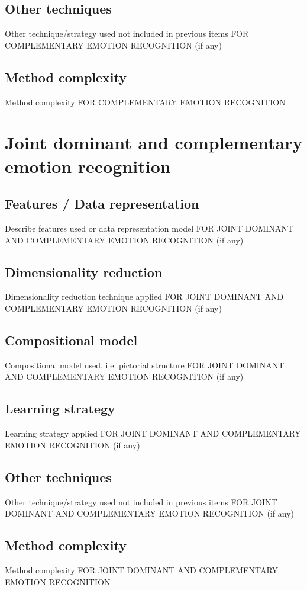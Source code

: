 \documentclass{article}
\begin{document}
\subsection{Other techniques}
Other technique/strategy used not included in previous items FOR COMPLEMENTARY EMOTION RECOGNITION (if any)

\subsection{Method complexity}
Method complexity FOR COMPLEMENTARY EMOTION RECOGNITION


\section{Joint dominant and complementary emotion recognition}
\subsection{Features / Data representation}
Describe features used or data representation model FOR JOINT DOMINANT AND COMPLEMENTARY EMOTION RECOGNITION (if any)

\subsection{Dimensionality reduction}
Dimensionality reduction technique applied FOR JOINT DOMINANT AND COMPLEMENTARY EMOTION RECOGNITION (if any)

\subsection{Compositional model}
Compositional model used, i.e. pictorial structure FOR JOINT DOMINANT AND COMPLEMENTARY EMOTION RECOGNITION (if any)

\subsection{Learning strategy}
Learning strategy applied FOR JOINT DOMINANT AND COMPLEMENTARY EMOTION RECOGNITION (if any)

\subsection{Other techniques}
Other technique/strategy used not included in previous items FOR JOINT DOMINANT AND COMPLEMENTARY EMOTION RECOGNITION (if any)

\subsection{Method complexity}
Method complexity FOR JOINT DOMINANT AND COMPLEMENTARY EMOTION RECOGNITION
\end{document}

